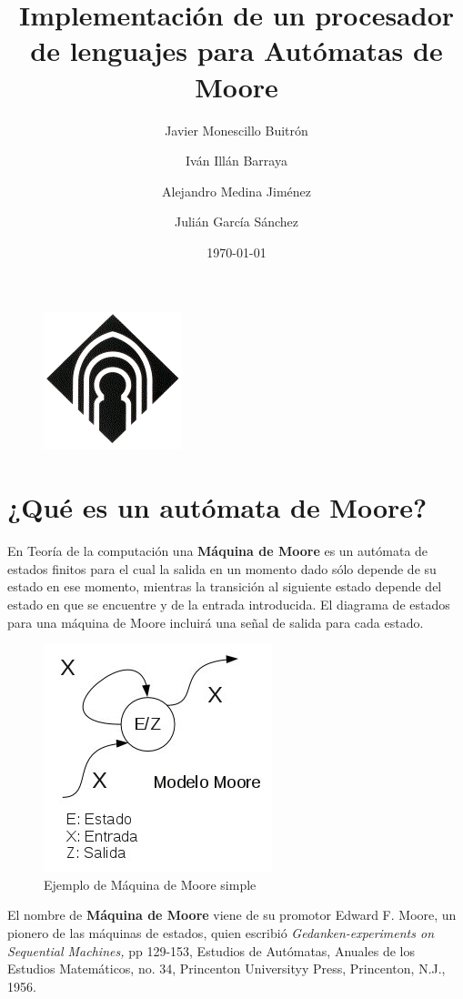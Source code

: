 \documentclass[12pt,a4paper]{article}
\author{Javier Monescillo Buitrón \and Iván Illán Barraya \and Alejandro Medina Jiménez \and Julián García Sánchez}
\title{Implementación de un procesador de lenguajes para Autómatas de Moore}
\date{\today}
\begin{document}
	
	\maketitle
	
	\begin{figure}[h]
		\centering
		\includegraphics[width=0.25
		\linewidth]{image004}
		\caption{}
		\label{fig:image004}
	\end{figure}

	\newpage
	\tableofcontents
	\newpage
	
	\section{¿Qué es un autómata de Moore?}
	En Teoría de la computación una \textbf{Máquina de Moore} es un autómata de estados finitos para el cual la salida en un momento dado sólo depende de su estado en ese momento, mientras la transición al siguiente estado depende del estado en que se encuentre y de la entrada introducida.
	El diagrama de estados para una máquina de Moore incluirá una señal de salida para cada estado.
	
	\begin{figure}[h]
		\centering
		\includegraphics[width=0.5\linewidth]{Modelo-moore}
		\caption{Ejemplo de Máquina de Moore simple}
		\label{fig:modelo-moore}
	\end{figure}
	
	
	
	El nombre de \textbf{Máquina de Moore} viene de su promotor Edward F. Moore, un pionero de las máquinas de estados, quien escribió \textit{Gedanken-experiments on Sequential Machines,} pp 129-153, Estudios de Autómatas, Anuales de los Estudios Matemáticos, no. 34, Princenton Universityy Press, Princenton, N.J., 1956.
	
\end{document}
